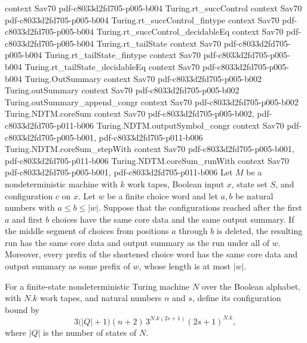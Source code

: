 \begin{theorem}
  {context}
  {Sav70}
  {pdf-c8033d2fd705-p005-b004}
\proofstep
  {Turing.rt_succControl}
  {context}
  {Sav70}
  {pdf-c8033d2fd705-p005-b004}
\proofstep
  {Turing.rt_succControl_fintype}
  {context}
  {Sav70}
  {pdf-c8033d2fd705-p005-b004}
\proofstep
  {Turing.rt_succControl_decidableEq}
  {context}
  {Sav70}
  {pdf-c8033d2fd705-p005-b004}
\proofstep
  {Turing.rt_tailState}
  {context}
  {Sav70}
  {pdf-c8033d2fd705-p005-b004}
\proofstep
  {Turing.rt_tailState_fintype}
  {context}
  {Sav70}
  {pdf-c8033d2fd705-p005-b004}
\proofstep
  {Turing.rt_tailState_decidableEq}
  {context}
  {Sav70}
  {pdf-c8033d2fd705-p005-b004}
\proofstep
  {Turing.OutSummary}
  {context}
  {Sav70}
  {pdf-c8033d2fd705-p005-b002}
\proofstep
  {Turing.outSummary}
  {context}
  {Sav70}
  {pdf-c8033d2fd705-p005-b002}
\proofstep
  {Turing.outSummary_append_congr}
  {context}
  {Sav70}
  {pdf-c8033d2fd705-p005-b002}
\proofstep
  {Turing.NDTM.coreSum}
  {context}
  {Sav70}
  {pdf-c8033d2fd705-p005-b002,
    pdf-c8033d2fd705-p011-b006}
\proofstep
  {Turing.NDTM.outputSymbol_congr}
  {context}
  {Sav70}
  {pdf-c8033d2fd705-p005-b001,
    pdf-c8033d2fd705-p011-b006}
\proofstep
  {Turing.NDTM.coreSum_stepWith}
  {context}
  {Sav70}
  {pdf-c8033d2fd705-p005-b001,
    pdf-c8033d2fd705-p011-b006}
\proofstep
  {Turing.NDTM.coreSum_runWith}
  {context}
  {Sav70}
  {pdf-c8033d2fd705-p005-b001,
    pdf-c8033d2fd705-p011-b006}
Let $M$ be a nondeterministic machine with $k$ work tapes, Boolean input $x$, state set
$S$, and configuration $c$ on $x$. Let $w$ be a finite choice word and let $a,b$ be
natural numbers with $a\le b\le |w|$. Suppose that the configurations reached after the
first $a$ and first $b$ choices have the same core data and the same output summary. If
the middle segment of choices from positions $a$ through $b$ is deleted, the resulting
run has the same core data and output summary as the run under all of $w$. Moreover,
every prefix of the shortened choice word has the same core data and output summary as
some prefix of $w$, whose length is at most $|w|$.
\end{theorem}

\begin{definition}
\label{Turing.FinNDTM.configBound}
\leanok
{}
For a finite-state nondeterministic Turing machine $N$ over the Boolean alphabet, with
$N.k$ work tapes, and natural numbers $n$ and $s$, define its configuration bound by
\[3\bigl(|Q|+1\bigr)(n+2)\,3^{N.k(2s+1)}(2s+1)^{N.k},\]
where $|Q|$ is the number of states of $N$.
\end{definition}

